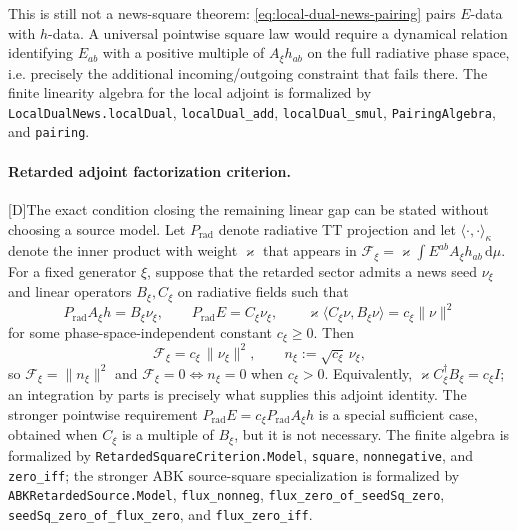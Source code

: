 \documentclass[11pt,a4paper]{article}
\newcommand{\diff}{\mathrm{d}}
\newcommand{\statusD}{\textsf{[D]}}
\begin{document}
This is still not a news-square theorem: \eqref{eq:local-dual-news-pairing} pairs \(E\)-data with \(h\)-data.  A universal pointwise square law would require a dynamical relation identifying \(E_{ab}\) with a positive multiple of \(A_\xi h_{ab}\) on the full radiative phase space, i.e. precisely the additional incoming/outgoing constraint that fails there.  The finite linearity algebra for the local adjoint is formalized by \texttt{LocalDualNews.localDual}, \texttt{localDual\_add}, \texttt{localDual\_smul}, \texttt{PairingAlgebra}, and \texttt{pairing}.

\paragraph{Retarded adjoint factorization criterion.}
\statusD The exact condition closing the remaining linear gap can be stated without choosing a source model.  Let \(P_{\mathrm{rad}}\) denote radiative TT projection and let \(\langle\cdot,\cdot\rangle_\kappa\) denote the inner product with weight \(\varkappa\) that appears in \(\mathcal F_\xi=\varkappa\int E^{ab}A_\xi h_{ab}\,\diff\mu\).  For a fixed generator \(\xi\), suppose that the retarded sector admits a news seed \(\nu_\xi\) and linear operators \(B_\xi,C_\xi\) on radiative fields such that
\begin{equation}\label{eq:retarded-factorization}
  P_{\mathrm{rad}}A_\xi h
  =
  B_\xi\nu_\xi ,
  \qquad
  P_{\mathrm{rad}}E
  =
  C_\xi\nu_\xi ,
  \qquad
  \varkappa\big\langle C_\xi\nu,B_\xi\nu\big\rangle
  =
  c_\xi\|\nu\|^2
\end{equation}
for some phase-space-independent constant \(c_\xi\ge0\).  Then
\begin{equation}\label{eq:retarded-square-law}
  \mathcal F_\xi
  =
  c_\xi\,
  \|\nu_\xi\|^2 ,
  \qquad
  n_\xi:=\sqrt{c_\xi}\,\nu_\xi ,
\end{equation}
so \(\mathcal F_\xi=\|n_\xi\|^2\) and \(\mathcal F_\xi=0\iff n_\xi=0\) when \(c_\xi>0\).  Equivalently, \(\varkappa C_\xi^\dagger B_\xi=c_\xi I\); an integration by parts is precisely what supplies this adjoint identity.  The stronger pointwise requirement \(P_{\mathrm{rad}}E=c_\xi P_{\mathrm{rad}}A_\xi h\) is a special sufficient case, obtained when \(C_\xi\) is a multiple of \(B_\xi\), but it is not necessary.  The finite algebra is formalized by \texttt{RetardedSquareCriterion.Model}, \texttt{square}, \texttt{nonnegative}, and \texttt{zero\_iff}; the stronger ABK source-square specialization is formalized by \texttt{ABKRetardedSource.Model}, \texttt{flux\_nonneg}, \texttt{flux\_zero\_of\_seedSq\_zero}, \texttt{seedSq\_zero\_of\_flux\_zero}, and \texttt{flux\_zero\_iff}.
\end{document}
